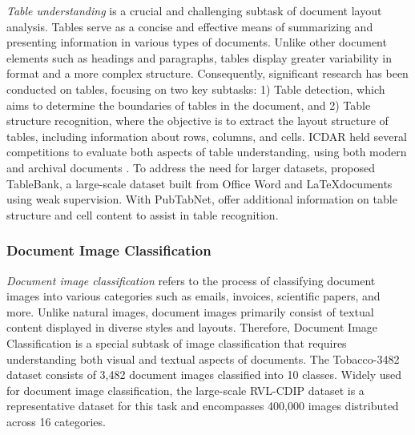 \textit{Table understanding} is a crucial and challenging subtask of document layout analysis. Tables serve as a concise and effective means of summarizing and presenting information in various types of documents. Unlike other document elements such as headings and paragraphs, tables display greater variability in format and a more complex structure. Consequently, significant research has been conducted on tables, focusing on two key subtasks: 1) Table detection, which aims to determine the boundaries of tables in the document, and 2) Table structure recognition, where the objective is to extract the layout structure of tables, including information about rows, columns, and cells. ICDAR held several competitions to evaluate both aspects of table understanding, using both modern and archival documents \citep{gobel2013icdar, gao2019icdar}. To address the need for larger datasets, \citet{li2019tablebank} proposed TableBank, a large-scale dataset built from Office Word and \LaTeX documents using weak supervision. With PubTabNet, \citet{zhong2020image} offer additional information on table structure and cell content to assist in table recognition.



\subsubsection{Document Image Classification}

\textit{Document image classification} refers to the process of classifying document images into various categories such as emails, invoices, scientific papers, and more. Unlike natural images, document images primarily consist of textual content displayed in diverse styles and layouts. Therefore, Document Image Classification is a special subtask of image classification that requires understanding both visual and textual aspects of documents. The Tobacco-3482 dataset \citep{kumar2013unsupervised} consists of 3,482 document images classified into 10 classes. Widely used for document image classification, the large-scale RVL-CDIP dataset \citep{harley2015evaluation} is a representative dataset for this task and encompasses 400,000 images distributed across 16 categories. 


